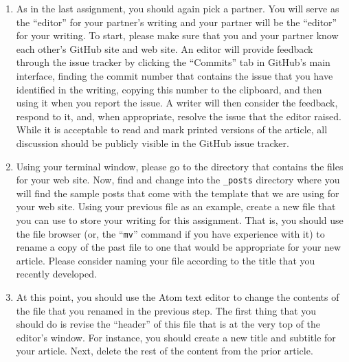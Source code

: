 \begin{enumerate}

  \itemsep 0em

  \item As in the last assignment, you should again pick a partner. You will serve as the ``editor'' for your partner's
    writing and your partner will be the ``editor'' for your writing. To start, please make sure that you and your
    partner know each other's GitHub site and web site. An editor will provide feedback through the issue tracker by
    clicking the ``Commits'' tab in GitHub's main interface, finding the commit number that contains the issue that you
    have identified in the writing, copying this number to the clipboard, and then using it when you report the issue. A
    writer will then consider the feedback, respond to it, and, when appropriate, resolve the issue that the editor
    raised. While it is acceptable to read and mark printed versions of the article, all discussion should be publicly
    visible in the GitHub issue tracker.

  \item Using your terminal window, please go to the directory that contains the files for your web site. Now, find and
    change into the {\tt \_posts} directory where you will find the sample posts that come with the template that we are
    using for your web site. Using your previous file as an example, create a new file that you can use to store your
    writing for this assignment. That is, you should use the file browser (or, the ``{\tt mv}'' command if you have
    experience with it) to rename a copy of the past file to one that would be appropriate for your new article. Please
    consider naming your file according to the title that you recently developed.

  \item At this point, you should use the Atom text editor to change the contents of the file that you renamed in the
    previous step. The first thing that you should do is revise the ``header'' of this file that is at the very top of
    the editor's window. For instance, you should create a new title and subtitle for your article. Next, delete the
    rest of the content from the prior article.


\end{enumerate}

